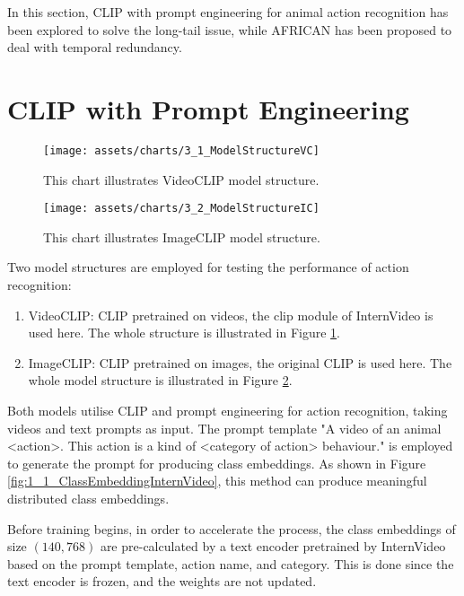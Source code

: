 In this section, CLIP with prompt engineering for animal action recognition has been explored to solve the long-tail issue, while AFRICAN has been proposed to deal with temporal redundancy. 

\section{CLIP with Prompt Engineering}

\begin{figure}[ht]
    \centering
    \texttt{[image: assets/charts/3\_1\_ModelStructureVC]}
    \caption[VideoCLIP model structure]{This chart illustrates VideoCLIP model structure.}
    \label{fig:modelstructure_vc}
\end{figure}

\begin{figure}[ht]
    \centering
    \texttt{[image: assets/charts/3\_2\_ModelStructureIC]}
    \caption[ImageCLIP Model Structure]{This chart illustrates ImageCLIP model structure.}
    \label{fig:modelstructure_ic}
\end{figure}

Two model structures are employed for testing the performance of action recognition: 
\begin{enumerate}
    \item VideoCLIP: CLIP pretrained on videos, the clip module of InternVideo \parencite{wang2022internvideo} is used here. The whole structure is illustrated in Figure \ref{fig:modelstructure_vc}.
    \item ImageCLIP: CLIP pretrained on images, the original CLIP \parencite{radford2021learning} is used here. The whole model structure is illustrated in Figure \ref{fig:modelstructure_ic}.
\end{enumerate}

Both models utilise CLIP and prompt engineering for action recognition, taking videos and text prompts as input. The prompt template "A video of an animal
<action>. This action is a kind of <category of action> behaviour." is employed to generate the prompt for producing class embeddings. As shown in Figure \ref{fig:1_1_ClassEmbeddingInternVideo}, this method can produce meaningful distributed class embeddings.

Before training begins, in order to accelerate the process, the class embeddings of size $(140, 768)$ are pre-calculated by a text encoder pretrained by InternVideo based on the prompt template, action name, and category. This is done since the text encoder is frozen, and the weights are not updated. 

